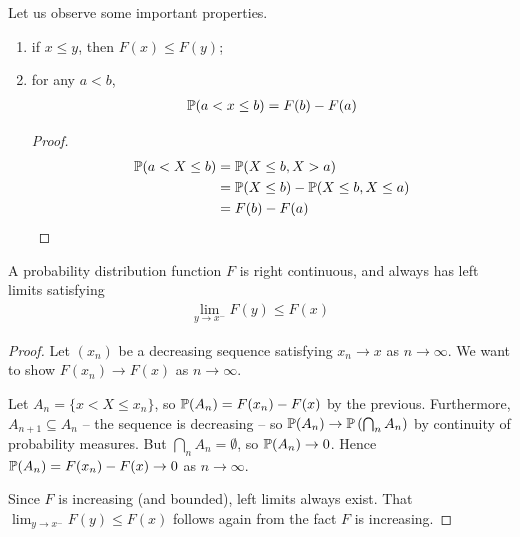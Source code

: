 \documentclass{../template/note}
\begin{document}
    Let us observe some important properties.
    \begin{enumerate}[label=\protect\circled{\arabic*}]
        \item if \(x \leq y\), then \(F(x) \leq F(y)\);
        \item for any \(a < b\),
        \begin{align*}
            \mathbb P(a < x \leq b) = F(b) - F(a)
        \end{align*}
        \begin{proof}
            \begin{align*}
                \mathbb P(a < X \leq b) &= \mathbb P(X \leq b, X > a) \\
                &= \mathbb P(X \leq b) - \mathbb P(X \leq b, X \leq a) \\
                &= F(b) - F(a)
            \end{align*}
        \end{proof}
    \end{enumerate}

    
    \begin{proposition}
        A probability distribution function \(F\) is right continuous, and always has left limits satisfying
        \begin{align*}
            \lim_{y \to x^-}F(y) \leq F(x)
        \end{align*}
    \end{proposition}
    
    \begin{proof}
        Let \((x_n)\) be a decreasing sequence satisfying \(x_n \to x\) as \(n \to \infty\). We want to show \(F(x_n) \to F(x)\) as \(n \to \infty\).

        Let \(A_n = \{x < X \leq x_n\}\), so \(\mathbb P(A_n) = F(x_n) - F(x)\) by the previous. Furthermore, \(A_{n+1} \subseteq A_n\) -- the sequence is decreasing -- so \(\mathbb P(A_n) \to \mathbb P\left(\bigcap_n A_n\right)\) by continuity of probability measures. But \(\bigcap_n A_n = \emptyset\), so \(\mathbb P(A_n) \to 0\). Hence \(\mathbb P(A_n)= F(x_n) - F(x) \to 0\) as \(n \to \infty\).

        Since \(F\) is increasing (and bounded), left limits always exist. That \(\lim_{y \to x^-} F(y) \leq F(x)\) follows again from the fact \(F\) is increasing.
    \end{proof}
    
\end{document}

